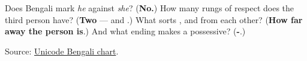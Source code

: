 \begin{tcolorbox}[breakable,colback=teal!4,colframe=teal!35!black,title={Before you move on}]
Does Bengali mark \emph{he} against \emph{she}? (\textbf{No.}) How many rungs of respect does the third person have? (\textbf{Two} — \textbf{} and \textbf{}.) What sorts \textbf{}, \textbf{} and \textbf{} from each other? (\textbf{How far away the person is}.) And what ending makes a possessive? (\textbf{-}.)

Source: \href{https://www.unicode.org/charts/PDF/U0980.pdf}{Unicode Bengali chart}.
\end{tcolorbox}
